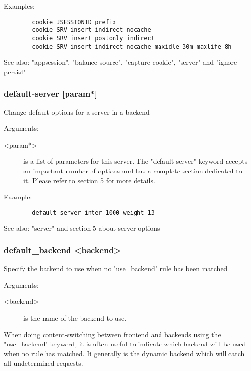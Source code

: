   Examples:
  \begin{verbatim}
        cookie JSESSIONID prefix
        cookie SRV insert indirect nocache
        cookie SRV insert postonly indirect
        cookie SRV insert indirect nocache maxidle 30m maxlife 8h
  \end{verbatim}

  See also: "appsession", "balance source", "capture cookie", "server"
             and "ignore-persist".

\subsubsection[default-server]{default-server [param*]}
  Change default options for a server in a backend
  
  
  Arguments:
  \begin{description}
  \item[<param*>]  is a list of parameters for this server. The "default-server"
              keyword accepts an important number of options and has a complete
              section dedicated to it. Please refer to section 5 for more
              details.
  \end{description}

  Example:
  \begin{verbatim}
        default-server inter 1000 weight 13
  \end{verbatim}

  See also: "server" and section 5 about server options

\subsubsection[default\_backend]{default\_backend <backend>}
  Specify the backend to use when no "use\_backend" rule has been matched.
  
  
  Arguments:
  \begin{description}
  \item[<backend>] is the name of the backend to use.
  \end{description}

  When doing content-switching between frontend and backends using the
  "use\_backend" keyword, it is often useful to indicate which backend will be
  used when no rule has matched. It generally is the dynamic backend which
  will catch all undetermined requests.

